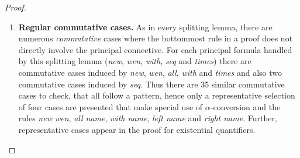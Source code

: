 \documentclass[UKenglish,acmsmall,authorversion]{acmart}
\theoremstyle{plain}
\begin{document}
{\begin{proof}
\begin{enumerate}[label=\textbf{\Alph*},ref=\Alph*,leftmargin=*]
{Consider the first commutative case for \textit{new} induced by equivariance, where the bottommost rule is of the form
$
\infer[]{
\new x. \new y. P \cpar \wen y. Q \cpar R
}{
\mathopen{\new y.} \left( \new x. P \cpar Q\right) \cpar R
}
$,
where $\vdash \mathopen{\new y.} \left( \new x. P \cpar Q\right) \cpar R$.
By the induction hypothesis, there exist $S$ and $T$ such that $\nfv{y}{S}$ and $\vdash \wen x. P \cpar Q \cpar T$ and either $S = T$ or $S = \wen y .T$, where
$\infer[]{R}{S}$.
Furthermore, the size of the proof of $\wen x. P \cpar Q \cpar T$ is bound above by the size of the proof of $\mathopen{\new y.} \left( \new x. P \cpar Q\right) \cpar R$, hence strictly bound above by the size of the proof of $\new x. \new y. P \cpar \wen y. Q \cpar R$.
Hence, by induction again, there exist $U$ and $V$ such that $\nfv{x}{U}$ and $\vdash P \cpar V$ and either $U = V$ or $U = \wen x. V$, and also $\infer[]{Q \cpar T}{U}$.
If $U = V$ then let $W = \wen y. V$, and if $U = \wen x. V$ then let $W = \wen x. \wen y. V$. 
Also, regardless of whether $S = T$ or $S = \wen y. T$, $\infer[]{\wen y. Q \cpar S}{\mathopen{\wen y.} \left( Q \cpar S \right)}$. Hence derivation %
$
\infer[]{
\wen y. Q \cpar R
}{
\infer[]{
\wen y. Q \cpar S
}{
\infer[]{
\mathopen{\wen y.} \left( Q \cpar T \right)
}{
\wen y. U
}}}$ can be constructed, where the premise is equivalent to $W$.
Furthermore, $
\infer[]{
\new y. P \cpar \wen y. V
}{
\infer[]{
\mathopen{\new y.} \left( P \cpar V \right)
}{
\infer[]{
\new y. \cunit 
}{ \cunit
}}}$,
and $\size{ \new y. P \cpar \wen y. V } \prec \size{ \new x. \new y. P \cpar \wen y. Q \cpar R }$,
since by Lemma~\ref{lemma:bound} $\size{ \wen y. V } \preceq \size{ \wen y. Q \cpar R }$.

}







\item \textbf{Regular commutative cases.} %
As in every splitting lemma, there are numerous \textit{commutative} cases where the bottommost rule in a proof does not directly involve the principal connective.
For each principal formula handled by this splitting lemma (\textit{new}, \textit{wen}, \textit{with}, \textit{seq} and \textit{times}) there are commutative cases induced by \textit{new}, \textit{wen}, \textit{all}, \textit{with} and \textit{times} and also two commutative cases induced by \textit{seq}.
Thus there are 35 similar commutative cases to check, that all follow a pattern, hence only a representative selection of four cases are presented that make special use of $\alpha$-conversion and the rules \textit{new wen},
\textit{all name}, \textit{with name}, \textit{left name} and \textit{right name}.
Further, representative cases appear in the proof for existential quantifiers.


\end{enumerate}
\end{proof}}
\end{document}
